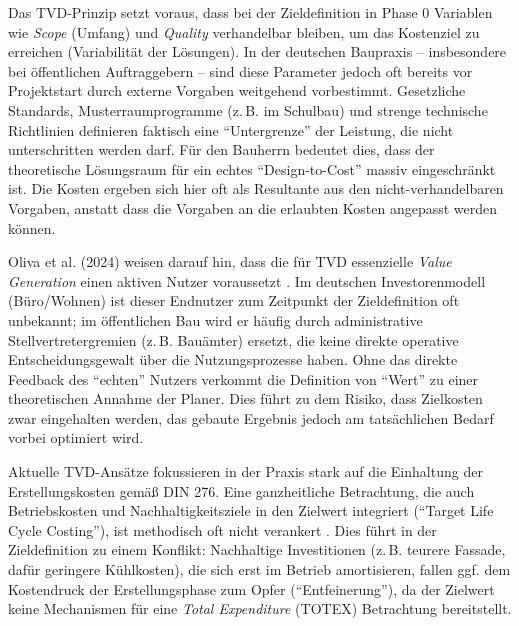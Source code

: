 Das \acs{TVD}-Prinzip setzt voraus, dass bei der Zieldefinition in Phase 0 Variablen wie \textit{Scope} (Umfang) und \textit{Quality} verhandelbar bleiben, um das Kostenziel zu erreichen (Variabilität der Lösungen).
In der deutschen Baupraxis – insbesondere bei öffentlichen Auftraggebern – sind diese Parameter jedoch oft bereits vor Projektstart durch externe Vorgaben weitgehend vorbestimmt. Gesetzliche Standards, Musterraumprogramme (z.\,B. im Schulbau) und strenge technische Richtlinien definieren faktisch eine \enquote{Untergrenze} der Leistung, die nicht unterschritten werden darf.
Für den Bauherrn bedeutet dies, dass der theoretische Lösungsraum für ein echtes \enquote{Design-to-Cost} massiv eingeschränkt ist. Die Kosten ergeben sich hier oft als Resultante aus den nicht-verhandelbaren Vorgaben, anstatt dass die Vorgaben an die erlaubten Kosten angepasst werden können.

Oliva et al. (2024) weisen darauf hin, dass die für \acs{TVD} essenzielle \textit{Value Generation} einen aktiven Nutzer voraussetzt \autocite[Vgl.][S.~8]{oliva_target_2024}. Im deutschen Investorenmodell (Büro/Wohnen) ist dieser Endnutzer zum Zeitpunkt der Zieldefinition oft unbekannt; im öffentlichen Bau wird er häufig durch administrative Stellvertretergremien (z.\,B. Bauämter) ersetzt, die keine direkte operative Entscheidungsgewalt über die Nutzungsprozesse haben.
Ohne das direkte Feedback des \enquote{echten} Nutzers verkommt die Definition von \enquote{Wert} zu einer theoretischen Annahme der Planer. Dies führt zu dem Risiko, dass Zielkosten zwar eingehalten werden, das gebaute Ergebnis jedoch am tatsächlichen Bedarf vorbei optimiert wird. \autocite[Vgl.][S.~821]{miron_target_2015}

Aktuelle \acs{TVD}-Ansätze fokussieren in der Praxis stark auf die Einhaltung der Erstellungskosten gemäß DIN 276. Eine ganzheitliche Betrachtung, die auch Betriebskosten und Nachhaltigkeitsziele in den Zielwert integriert (\enquote{Target Life Cycle Costing}), ist methodisch oft nicht verankert \autocite[Vgl.][S.~199 f]{ouma_target_2025}.
Dies führt in der Zieldefinition zu einem Konflikt: Nachhaltige Investitionen (z.\,B. teurere Fassade, dafür geringere Kühlkosten), die sich erst im Betrieb amortisieren, fallen ggf. dem Kostendruck der Erstellungsphase zum Opfer (\enquote{Entfeinerung}), da der Zielwert keine Mechanismen für eine \textit{Total Expenditure} (\acs{TOTEX}) Betrachtung bereitstellt.

